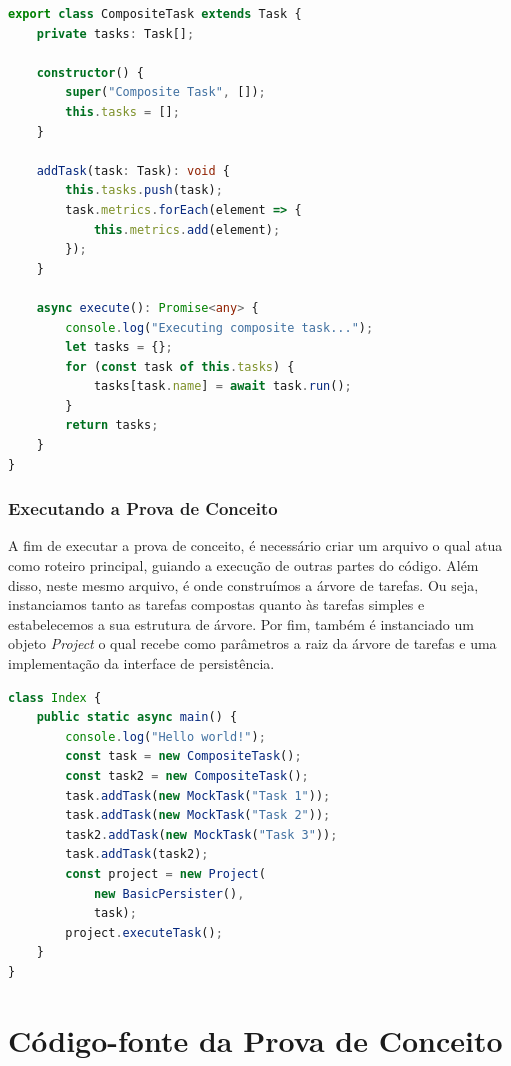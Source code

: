 \documentclass[12pt]{tcc}
\begin{document}
\begin{lstlisting}[label={lst:composite_task}, caption={Tarefa composta, define o comportamento de todos os nós não folha da árvore de tarefas.}, language=TypeScript]
export class CompositeTask extends Task {
	private tasks: Task[];

	constructor() {
		super("Composite Task", []);
		this.tasks = [];
	}

	addTask(task: Task): void {
		this.tasks.push(task);
		task.metrics.forEach(element => {
			this.metrics.add(element);
		});
	}

	async execute(): Promise<any> {
		console.log("Executing composite task...");
		let tasks = {};
		for (const task of this.tasks) {
			tasks[task.name] = await task.run();
		}
		return tasks;
	}
}
\end{lstlisting}


\subsection{Executando a Prova de Conceito}
\label{sec:exe_poc}
A fim de executar a prova de conceito, é necessário criar um arquivo o qual atua como roteiro principal, guiando a execução de outras partes do código.
Além disso, neste mesmo arquivo, é onde construímos a árvore de tarefas.
Ou seja, instanciamos tanto as tarefas compostas quanto às tarefas simples e estabelecemos a sua estrutura de árvore.
Por fim, também é instanciado um objeto \emph{Project} o qual recebe como parâmetros a raiz da árvore de tarefas e uma implementação da interface de persistência.

\begin{lstlisting}[label={lst:index_ts}, caption={Exemplo de roteiro principal para executar a prova de conceito.}, language=TypeScript]
class Index {
	public static async main() {
		console.log("Hello world!");
		const task = new CompositeTask();
		const task2 = new CompositeTask();
		task.addTask(new MockTask("Task 1"));
		task.addTask(new MockTask("Task 2"));
		task2.addTask(new MockTask("Task 3"));
		task.addTask(task2);
		const project = new Project(
			new BasicPersister(),
			task);
		project.executeTask();
	}
}
\end{lstlisting}


\appendix
\chapter{Código-fonte da Prova de Conceito}
\label{apx:mock_source}
\end{document}
